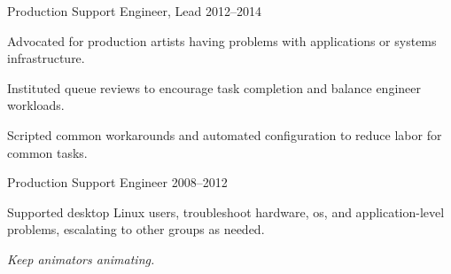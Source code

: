  \cventry
  {Production Support Engineer, Lead}
  {}
  {}
  {2012--2014}
  {
    \begin{cvitems}
    \item {Advocated for production artists having problems with applications or systems infrastructure.}
    \item {Instituted queue reviews to encourage task completion and balance engineer workloads.}
    \item {Scripted common workarounds and automated configuration to reduce labor for common tasks.}
    \end{cvitems}
  }

  \cventry
  {Production Support Engineer}
  {}
  {}
  {2008--2012}
  {
    \begin{cvitems}
    \item {Supported desktop Linux users, troubleshoot hardware, os, and application-level problems, escalating to other groups as needed.}
    \item {\textit{Keep animators animating.}}
    \end{cvitems}
  }

\vspace{\acvSectionContentTopSkip}

